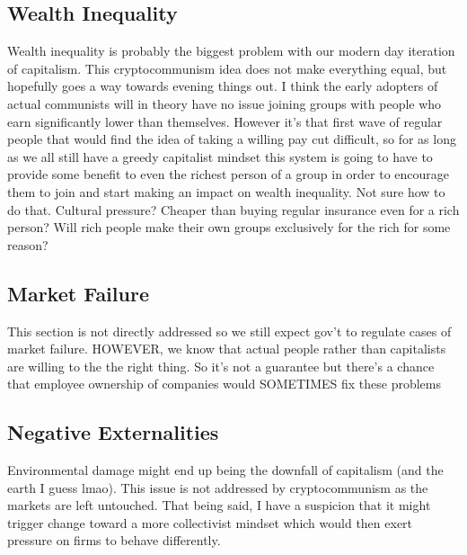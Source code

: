 \documentclass{article}[10pt]
\begin{document}
\subsection{Wealth Inequality}
Wealth inequality is probably the biggest problem with our modern day iteration of capitalism. 
This cryptocommunism idea does not make everything equal, but hopefully goes a way towards evening things out. 
I think the early adopters of actual communists will in theory have no issue joining groups with people who earn significantly lower than themselves. 
However it's that first wave of regular people that would find the idea of taking a willing pay cut difficult, so for as long as we all still have a greedy capitalist mindset this system is going to have to provide some benefit to even the richest person of a group in order to encourage them to join and start making an impact on wealth inequality. 
Not sure how to do that. 
Cultural pressure? 
Cheaper than buying regular insurance even for a rich person? 
Will rich people make their own groups exclusively for the rich for some reason?


\subsection{Market Failure} 
This section is not directly addressed so we still expect gov’t to regulate cases of market failure. 
HOWEVER, we know that actual people rather than capitalists are willing to the the right thing. 
So it’s not a guarantee but there’s a chance that employee ownership of companies would SOMETIMES fix these problems

\subsection{Negative Externalities} 
Environmental damage might end up being the downfall of capitalism (and the earth I guess lmao). 
This issue is not addressed by cryptocommunism as the markets are left untouched. 
That being said, I have a suspicion that it might trigger change toward a more collectivist mindset which would then exert pressure on firms to behave differently. 
\end{document}
